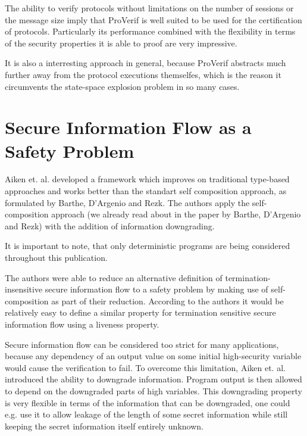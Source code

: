 \documentclass[a4paper,UKenglish]{lipics-v2018}
\begin{document}
The ability to verify protocols without limitations on the number of sessions or the message size imply that ProVerif is well suited to be used for the certification of protocols. Particularly its performance combined with the flexibility in terms of the security properties it is able to proof are very impressive.\cite{ProVerif}

It is also a interresting approach in general, because ProVerif abstracts much further away from the protocol executions themselfes, which is the reason it circumvents the state-space explosion problem in so many cases.




\section{Secure Information Flow as a Safety Problem}

Aiken et. al. developed a framework which improves on traditional type-based approaches and works better than the standart self composition approach, as formulated by Barthe, D'Argenio and Rezk.\cite{information_flow_by_self_composition}
The authors apply the self-composition approach (we already read about in the paper by Barthe, D'Argenio and Rezk) with the addition of information downgrading.\cite{secure_information_flow_safety}

It is important to note, that only deterministic programs are being considered throughout this publication. 

The authors were able to reduce an alternative definition of termination-insensitive secure information flow to a safety problem by making use of self-composition as part of their reduction. According to the authors it would be relatively easy to define a similar property for termination sensitive secure information flow using a liveness property.\cite{secure_information_flow_safety}

Secure information flow can be considered too strict for many applications, because any dependency of an output value on some initial high-security variable would cause the verification to fail. To overcome this limitation, Aiken et. al. introduced the ability to downgrade information. Program output is then allowed to depend on the downgraded parts of high variables. This downgrading property is very flexible in terms of the information that can be downgraded, one could e.g. use it to allow leakage of the length of some secret information while still keeping the secret information itself entirely unknown.\cite{secure_information_flow_safety}
\end{document}
